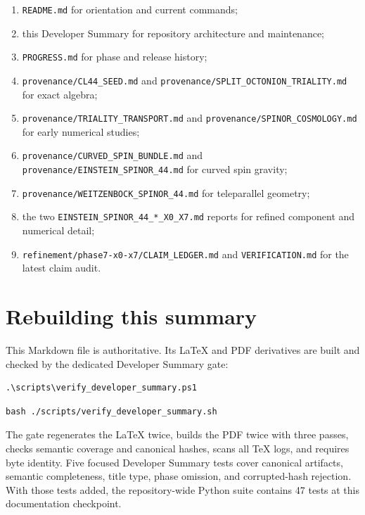 \documentclass[11pt]{article}
\begin{document}
\begin{enumerate}
\item \texttt{README.m\allowbreak{}d} for orientation and current commands;
\item this Developer Summary for repository architecture and maintenance;
\item \texttt{PROGRESS\allowbreak{}.md} for phase and release history;
\item \texttt{provenan\allowbreak{}ce/CL44\_\allowbreak{}SEED.md} and
\texttt{provenan\allowbreak{}ce/SPLIT\allowbreak{}\_OCTONIO\allowbreak{}N\_TRIALI\allowbreak{}TY.md} for exact algebra;

\item \texttt{provenan\allowbreak{}ce/TRIAL\allowbreak{}ITY\_TRAN\allowbreak{}SPORT.md} and
\texttt{provenan\allowbreak{}ce/SPINO\allowbreak{}R\_COSMOL\allowbreak{}OGY.md} for early numerical studies;

\item \texttt{provenan\allowbreak{}ce/CURVE\allowbreak{}D\_SPIN\_B\allowbreak{}UNDLE.md} and
\texttt{provenan\allowbreak{}ce/EINST\allowbreak{}EIN\_SPIN\allowbreak{}OR\_44.md} for curved spin gravity;

\item \texttt{provenan\allowbreak{}ce/WEITZ\allowbreak{}ENBOCK\_S\allowbreak{}PINOR\_44\allowbreak{}.md} for teleparallel geometry;
\item the two \texttt{EINSTEIN\allowbreak{}\_SPINOR\_\allowbreak{}44\_*\_X0\_\allowbreak{}X7.md} reports for refined component and
numerical detail;

\item \texttt{refineme\allowbreak{}nt/phase\allowbreak{}7-x0-x7/\allowbreak{}CLAIM\_LE\allowbreak{}DGER.md} and \texttt{VERIFICA\allowbreak{}TION.md} for the
latest claim audit.

\end{enumerate}

\section{Rebuilding this summary}

This Markdown file is authoritative. Its LaTeX and PDF derivatives are built and checked by the dedicated Developer Summary gate:

\begin{Verbatim}[fontsize=\small]
.\scripts\verify_developer_summary.ps1
\end{Verbatim}

\begin{Verbatim}[fontsize=\small]
bash ./scripts/verify_developer_summary.sh
\end{Verbatim}

The gate regenerates the LaTeX twice, builds the PDF twice with three passes, checks semantic coverage and canonical hashes, scans all TeX logs, and requires byte identity. Five focused Developer Summary tests cover canonical artifacts, semantic completeness, title type, phase omission, and corrupted-hash rejection. With those tests added, the repository-wide Python suite contains 47 tests at this documentation checkpoint.
\end{document}

